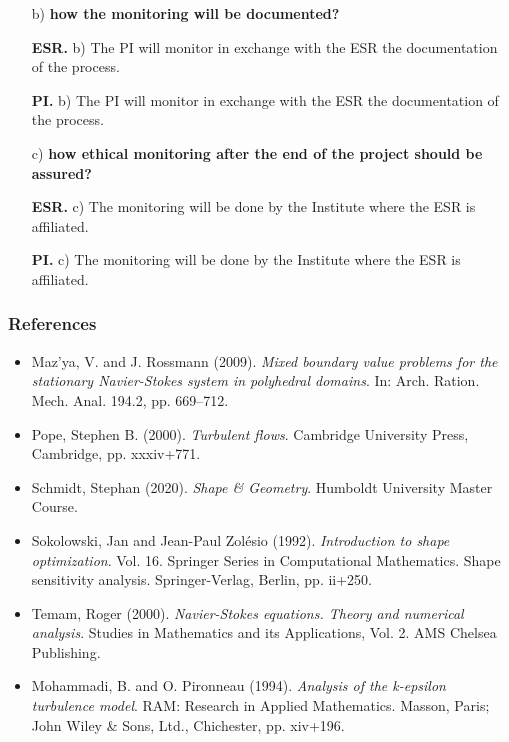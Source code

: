 \documentclass[t,xcolor=table,english]{beamer}   %
\begin{document}
\begin{frame}
	\begin{itemize}
		\item[b)] {\color{blue}\bf how the monitoring will be documented?}
		
		\textbf{ESR.} b) The PI  will monitor in exchange with the ESR the documentation of the process.
		
		\textbf{PI.} b) The PI  will monitor in exchange with the ESR the documentation of the process.
		
		\item[c)] {\color{blue}\bf how ethical monitoring after the end of the project should be assured?}
		
		\textbf{ESR.} c) The monitoring will be done by the Institute where the ESR is affiliated.
		
		\textbf{PI.} c) The monitoring will be done by the Institute where the ESR is affiliated.
	\end{itemize}
\end{frame}

\begin{frame}
	\frametitle{References}
	\begin{itemize}
		\item Maz'ya, V. and J. Rossmann (2009). \textit{Mixed boundary value problems for the stationary Navier-Stokes system in polyhedral domains}. In: Arch. Ration. Mech. Anal. 194.2, pp. 669–712.
		\item Pope, Stephen B. (2000). \textit{Turbulent flows}. Cambridge University Press, Cambridge, pp. xxxiv+771.
		\item Schmidt, Stephan (2020). \textit{Shape \& Geometry}. Humboldt University Master Course.
		\item Sokolowski, Jan and Jean-Paul Zol\'esio (1992). \textit{Introduction to shape optimization}. Vol. 16. Springer Series in Computational Mathematics. Shape sensitivity analysis. Springer-Verlag, Berlin, pp. ii+250.
		\item Temam, Roger (2000). \textit{Navier-Stokes equations. Theory and numerical analysis}. Studies in Mathematics and its Applications, Vol. 2.
		AMS Chelsea Publishing.
		\item Mohammadi, B. and O. Pironneau (1994). \textit{Analysis of the k-epsilon turbulence model}. RAM: Research in Applied Mathematics. Masson, Paris; John Wiley \& Sons, Ltd., Chichester, pp. xiv+196.
	\end{itemize}
\end{frame}
\end{document}
